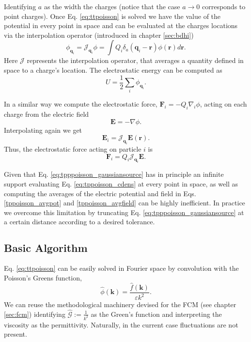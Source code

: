 \documentclass[ twoside,openright,titlepage,numbers=noenddot,%
headinclude,footinclude,cleardoublepage=empty,abstract=on,
BCOR=5mm,paper=b5,fontsize=11pt, dvipsnames
]{scrreprt}
\renewcommand{\vec}[1]{\bm{#1}}
\newcommand{\oper}[1]{\mathcal{#1}}
\newcommand{\fou}[1]{\widehat{#1}}
\newcommand{\ppos}{q}
\newcommand{\fpos}{r}
\begin{document}
Identifying $a$ as the width the charges (notice that the case $a\rightarrow 0$ corresponds to point charges).
Once Eq. \eqref{eq:ttpoisson} is solved we have the value of the potential in every point in space and can be evaluated at the charges locations via the interpolation operator (introduced in chapter \ref{sec:bdhi})
\begin{equation}  
  \phi_{\vec{\ppos}_i} = \oper{J}_{\vec{\ppos}_i}\phi = \int Q_i\delta_a(\vec{\ppos}_i - \vec{\fpos})\phi(\vec{\fpos})d\vec{\fpos}.
\end{equation}
Here $\oper{J}$ represents the interpolation operator, that averages a quantity defined in space to a charge's location.
The electrostatic energy can be computed as
\begin{equation}
  \label{tppoisson_avgpot}
  U =  \frac{1}{2}\sum_i{\phi_{\vec{\ppos}_i}}.
\end{equation}

In a similar way we compute the electrostatic force, $\vec{F}_i = -Q_i\nabla_i{\phi}$, acting on each charge from the electric field
\begin{equation}
  \label{eq:tppoisson_fieldnablaphi}
  \vec{E} = -\nabla{\phi}.
\end{equation}
Interpolating again we get
\begin{equation}
  \label{tppoisson_avgfield}
\vec{E}_i = \oper{J}_{\vec{\ppos}_i}\vec{E}(\vec{\fpos}).
\end{equation}
Thus, the electrostatic force acting on particle $i$ is
\begin{equation}
  \label{eq:tppoisson_force}
\vec{F}_i = Q_i\oper{J}_{\vec{\ppos}_i}\vec{E}.
\end{equation}

Given that Eq. \eqref{eq:tpppoisson_gaussiansource} has in principle an infinite support evaluating Eq. \eqref{eq:tppoisson_cdens} at every point in space, as well as computing the averages of the electric potential and field in Eqs. \eqref{tppoisson_avgpot} and \eqref{tppoisson_avgfield} can be highly inefficient. In practice we overcome this limitation by truncating Eq. \eqref{eq:tpppoisson_gaussiansource} at a certain distance according to a desired tolerance.
\subsection*{Basic Algorithm}
Eq. \eqref{eq:ttpoisson} can be easily solved in Fourier space by convolution with the Poisson's Greens function,
\begin{equation}
  \label{tppoisson_phihat}
 \hat\phi(\vec{k}) = \frac{\hat f(\vec{k})}{\varepsilon k^2}.
\end{equation}
We can reuse the methodological machinery devised for the \gls{FCM} (see chapter \ref{sec:fcm}) identifying $\fou{\oper{G}} := \frac{1}{k^2}$ as the Green's function and interpreting the viscosity as the permittivity. Naturally, in the current case fluctuations are not present.
\end{document}
